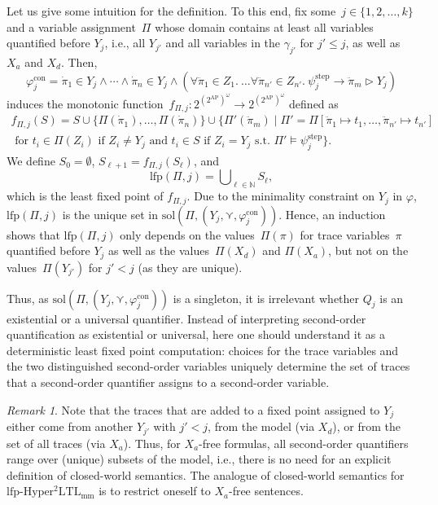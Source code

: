 \documentclass[dvipsnames,10pt,a4paper]{amsart}
\theoremstyle{definition}
\theoremstyle{remark}
\newtheorem{rem}[thm]{Remark}
\newcommand{\nats}{\mathbb{N}}
\renewcommand{\phi}{\varphi}
\newcommand{\pow}[1]{2^{#1}}
\newcommand{\set}[1]{\{#1\}}
\newcommand{\lfpsohyltlfp}{\mathrm{lfp\text{-}{Hyper^2LTL_{\mathrm{mm}}}}\xspace}
\newcommand{\ap}[0]{\mathrm{AP}}
\newcommand{\univar}{X_a}
\newcommand{\unidisvar}{X_d}
\newcommand{\smallest}{\curlyvee}
\newcommand{\solutions}{\mathrm{sol}}
\newcommand{\con}{\mathrm{con}}
\newcommand{\step}{\mathrm{step}}
\newcommand{\tracein}{\mathrel{\triangleright}}
\newcommand{\quant}{Q}
\newcommand{\overdot}[1]{\dot{#1}}
\newcommand{\overdotdot}[1]{\ddot{#1}}
\newcommand{\lfp}{\mathrm{lfp}}
\begin{document}
Let us give some intuition for the definition. To this end, fix some~$j \in \set{1,2,\ldots, k}$ and a variable assignment~$\Pi$ whose domain contains at least all variables quantified before $Y_j$, i.e., all $Y_{j'}$ and all variables in the $\gamma_{j'}$ for $j' \le j$, as well as $\univar$ and $\unidisvar$. 
Then, 
\[ \phi_j^\con= \overdot{\pi}_1\in Y_j \wedge \cdots \wedge \overdot{\pi}_n \in Y_j \wedge \left(  \forall \overdotdot{\pi}_1 \in Z_1.\ \ldots \forall \overdotdot{\pi}_{n'} \in Z_{n'}.\ \psi^\step_j \rightarrow \overdotdot{\pi}_m \tracein Y_j\right) \]
induces the monotonic function~$f_{\Pi,j} \colon \pow{(\pow{\ap})^\omega} \rightarrow \pow{(\pow{\ap})^\omega}$ defined as
\begin{multline*}
f_{\Pi,j}(S) = S \cup \set{\Pi(\overdot{\pi}_1), \ldots, \Pi(\overdot{\pi}_n)} \cup  \set{\Pi'(\overdotdot{\pi}_m) \mid \Pi' = \Pi[\overdotdot{\pi}_1 \mapsto t_1, \ldots, \overdotdot{\pi}_{n'} \mapsto t_{n'}]\\
 \text{ for } t_i \in \Pi(Z_i) \text{ if } Z_i \neq Y_j \text{ and }t_i \in S \text{ if } Z_i = Y_j \text{ s.t. }\Pi' \models \psi^\step_j}.    
\end{multline*}
We define $S_0 = \emptyset$, $S_{\ell+1} =  f_{\Pi,j}(S_\ell)$, and 
\[\lfp(\Pi,j) = \bigcup\nolimits_{\ell\in\nats} S_\ell,\] 
which is the least fixed point of $f_{\Pi,j}$. Due to the minimality constraint on $Y_j$ in $\phi$, $\lfp(\Pi,j)$ is the unique set in $\solutions(\Pi, (Y_j,\smallest,\phi^\con_j))$. Hence, an induction shows that $\lfp(\Pi,j)$ only depends on the values~$\Pi(\pi)$ for trace variables~$\pi$ quantified before $Y_j$ as well as the values~$\Pi(\unidisvar)$ and $\Pi(\univar)$, but not on the values~$\Pi(Y_{j'})$ for $j' < j$ (as they are unique).

Thus, as $\solutions(\Pi, (Y_j,\smallest,\phi^\con_j))$ is a singleton, it is irrelevant whether $\quant_j$ is an existential or a universal quantifier. Instead of interpreting second-order quantification as existential or universal, here one should understand it as a deterministic least fixed point computation: choices for the trace variables and the two distinguished second-order variables uniquely determine the set of traces that a second-order quantifier assigns to a second-order variable.

\begin{rem}
\label{remark_lfpcw}
Note that the traces that are added to a fixed point assigned to $Y_j$ either come from another $Y_{j'}$ with $j' < j$, from the model (via $\unidisvar$), or from the set of all traces (via $\univar$). 
Thus, for $\univar$-free formulas, all second-order quantifiers range over (unique) subsets of the model, i.e., there is no need for an explicit definition of closed-world semantics. The analogue of closed-world semantics for $\lfpsohyltlfp$ is to restrict oneself to $\univar$-free sentences.
\end{rem}
\end{document}
